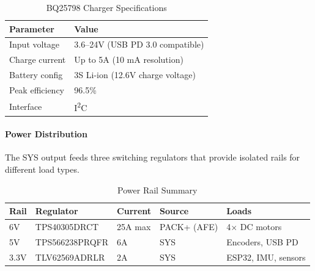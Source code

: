 \begin{table}[H]
\centering
\caption{BQ25798 Charger Specifications}
\begin{tabular}{@{}ll@{}}
\toprule
\textbf{Parameter} & \textbf{Value} \\
\midrule
Input voltage & 3.6--24V (USB PD 3.0 compatible) \\
Charge current & Up to 5A (10 mA resolution) \\
Battery config & 3S Li-ion (12.6V charge voltage) \\
Peak efficiency & 96.5\% \\
Interface & I\textsuperscript{2}C \\
\bottomrule
\end{tabular}
\end{table}

\paragraph{Power Distribution}
The SYS output feeds three switching regulators that provide isolated rails for different load types.

\begin{table}[H]
\centering
\caption{Power Rail Summary}
\label{tab:power-rails}
\begin{tabular}{@{}lllll@{}}
\toprule
\textbf{Rail} & \textbf{Regulator} & \textbf{Current} & \textbf{Source} & \textbf{Loads} \\
\midrule
6V & TPS40305DRCT & 25A max & PACK+ (AFE) & 4$\times$ DC motors \\
5V & TPS566238PRQFR & 6A & SYS & Encoders, USB PD \\
3.3V & TLV62569ADRLR & 2A & SYS & ESP32, IMU, sensors \\
\bottomrule
\end{tabular}
\end{table}


